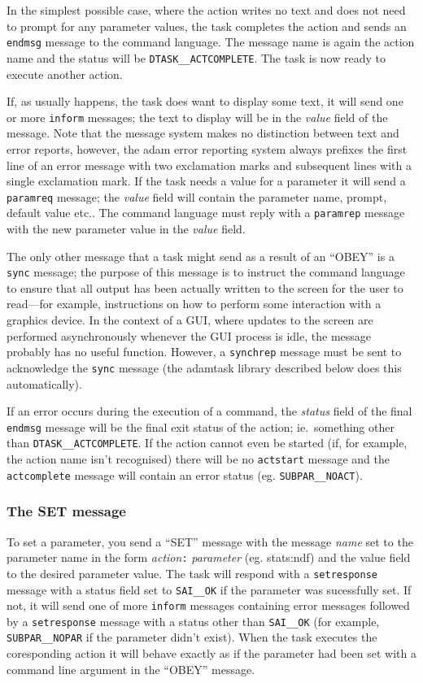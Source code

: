 In the simplest possible case, where the action writes no text and does
not need to prompt for any parameter values, the task completes the action
and sends an {\tt endmsg} message to the command language. The message name
is again the action name
and the status will be {\tt DTASK\_\_ACTCOMPLETE}. The task is now ready to
execute another action.

If, as usually happens, the task does want to display some text, it will send
one or more {\tt inform} messages; the text to display will be in the {\em
value} field of the message. Note that the message system makes no distinction
between text and error reports, however, the adam error reporting system
always prefixes the first line of an error message with two exclamation marks
and subsequent lines with a single exclamation mark. If the task needs
a value for a parameter it will send a {\tt paramreq} message; the {\em value}
field will contain the parameter name, prompt, default
value etc.. The command language must reply with a {\tt paramrep} message
with the new parameter value in the {\em value} field.

The only other message that a task might send as a result of an ``OBEY'' is
a {\tt sync} message; the purpose of this message is to instruct the command
language to ensure that all output has been actually written to the screen
for the user to read---for example, instructions on how to perform some
interaction with a graphics device. In the context of a GUI, where updates
to the screen are performed asynchronously whenever the GUI process is idle,
the message probably has no useful function. However, a {\tt synchrep}
message must be sent to acknowledge the {\tt sync} message (the adamtask
library described below does this automatically).

If an error occurs during the execution of a command, the {\em status} field
of the final {\tt endmsg} message will be the final exit status of the action;
ie.\ something other than {\tt DTASK\_\_ACTCOMPLETE}. If the action cannot even
be started (if, for example, the action name isn't recognised) there will be
no {\tt actstart} message and the {\tt actcomplete} message will contain an
error status (eg. {\tt SUBPAR\_\_NOACT}).

\subsubsection{The SET message}

To set a parameter, you send a ``SET'' message with the message {\em
name} set to the parameter name in the form {\em action}{\tt{:}}{\em
parameter} (eg.  stats:ndf) and the value field to the desired
parameter value. The task will respond with a {\tt setresponse} message
with a status field set to {\tt SAI\_\_OK} if the parameter was
sucessfully set.  If not, it will send one of more {\tt inform}
messages containing error messages followed by a {\tt setresponse}
message with a status other than {\tt SAI\_\_OK} (for example, {\tt
SUBPAR\_\_NOPAR} if the parameter didn't exist). When the task executes
the coresponding action it will behave exactly as if the parameter had
been set with a command line argument in the ``OBEY'' message.

